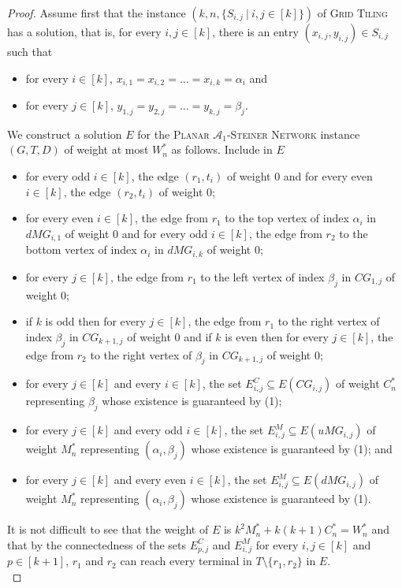 \documentclass[a4paper,11pt]{article}
\theoremstyle{plain}
\newtheorem{identification rule}{Identification Rule}
\theoremstyle{definition}
\theoremstyle{remark}
\newcommand{\oldC}{\mathcal{A}}
\begin{document}
\begin{proof}
Assume first that the instance $(k,n,\{S_{i,j}~|~i,j \in [k]\})$ of \textsc{Grid Tiling} has a solution, that is, for every $i,j \in [k]$, there is an entry $(x_{i,j},y_{i,j}) \in S_{i,j}$ such that
\begin{itemize}
\item for every $i \in [k]$, $x_{i,1} = x_{i,2} = \ldots = x_{i,k} = \alpha_i$ and
\item for every $j \in [k]$, $y_{1,j} = y_{2,j} = \ldots = y_{k,j} = \beta_j$.
\end{itemize}
We construct a solution $E$ for the \textsc{Planar $\oldC_1$-Steiner Network} instance $(G,T,D)$ of weight at most $W_n^*$ as follows. Include in $E$
\begin{itemize}
\item for every odd $i \in [k]$, the edge $(r_1,t_i)$ of weight 0 and for every even $i \in [k]$, the edge $(r_2,t_i)$ of weight 0;
\item for every even $i \in [k]$, the edge from $r_1$ to the top vertex of index $\alpha_i$ in $dMG_{i,1}$ of weight 0 and for every odd $i \in [k]$, the edge from $r_2$ to the bottom vertex of index $\alpha_i$ in $dMG_{i,k}$ of weight 0;  
\item for every $j \in [k]$, the edge from $r_1$ to the left vertex of index $\beta_j$ in $CG_{1,j}$ of weight 0;
\item if $k$ is odd then for every $j \in [k]$, the edge from $r_1$ to the right vertex of index $\beta_j$ in $CG_{k+1,j}$ of weight 0 and if $k$ is even then for every $j \in [k]$, the edge from $r_2$ to the right vertex of $\beta_j$ in $CG_{k+1,j}$ of weight 0;
\item for every $j \in [k]$ and every $i \in [k]$, the set $E^C_{i,j} \subseteq E(CG_{i,j})$ of weight $C_n^*$ representing $\beta_j$ whose existence is guaranteed by (1);
\item for every $j \in [k]$ and every odd $i \in [k]$, the set $E^M_{i,j} \subseteq E(uMG_{i,j})$ of weight $M_n^*$ representing $(\alpha_i,\beta_j)$ whose existence is guaranteed by (1); and
\item for every $j \in [k]$ and every even $i \in [k]$, the set $E^M_{i,j} \subseteq E(dMG_{i,j})$ of weight $M_n^*$ representing $(\alpha_i,\beta_j)$ whose existence is guaranteed by (1).
\end{itemize}
It is not difficult to see that the weight of $E$ is $k^2M_n^* + k(k+1)C_n^* = W_n^*$ and that by the connectedness of the sets $E^C_{p,j}$ and $E^M_{i,j}$ for every $i,j \in [k]$ and $p \in [k+1]$, $r_1$ and $r_2$ can reach every terminal in $T \setminus \{r_1,r_2\}$ in $E$.\\ 


\end{proof}
\end{document}
